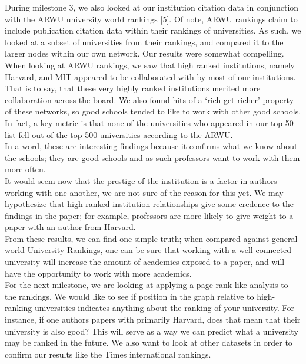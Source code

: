 \documentclass[times, 10pt,twocolumn]{article}
\begin{document}
During milestone 3, we also looked at our institution citation data in conjunction with the ARWU university world rankings [5]. Of note, ARWU rankings claim to include publication citation data within their rankings of universities. As such, we looked at a subset of universities from their rankings, and compared it to the larger nodes within our own network. Our results were somewhat compelling. \\

When looking at ARWU rankings, we saw that high ranked institutions, namely Harvard, and MIT appeared to be collaborated with by most of our institutions. That is to say, that these very highly ranked institutions merited more collaboration across the board. We also found hits of a `rich get richer' property of these networks, so good schools tended to like to work with other good schools. In fact, a key metric is that none of the universities who appeared in our top-50 list fell out of the top 500 universities according to the ARWU.\\

In a word, these are interesting findings because it confirms what we know about the schools; they are good schools and as such professors want to work with them more often. \\

It would seem now that the prestige of the institution is a factor in authors working with one another, we are not sure of the reason for this yet. We may hypothesize that high ranked institution relationships give some credence to the findings in the paper; for example, professors are more likely to give weight to a paper with an author from Harvard.\\

From these results, we can find one simple truth; when compared against general world University Rankings, one can be sure that working with a well connected university will increase the amount of academics exposed to a paper, and will have the opportunity to work with more academics. \\

For the next milestone, we are looking at applying a page-rank like analysis to the rankings. We would like to see if position in the graph relative to high-ranking universities indicates anything about the ranking of your university. For instance, if one authors papers with primarily Harvard, does that mean that their university is also good? This will serve as a way we can predict what a university may be ranked in the future. We also want to look at other datasets in order to confirm our results like the Times international rankings. \\
\end{document}
